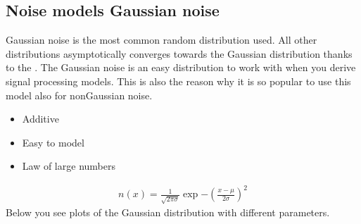 \documentclass[letterpaper,10pt,english]{sphinxmanual}
\begin{document}
\noindent{}


\subsection{Noise models \sphinxhyphen{} Gaussian noise}
\label{\detokenize{02-ImageEnhancement:noise-models-gaussian-noise}}
\sphinxAtStartPar
Gaussian noise is the most common random distribution used. All other distributions asymptotically converges towards the Gaussian distribution thanks to the . The Gaussian noise is an easy distribution to work with when you derive signal processing models. This is also the reason why it is so popular to use this model also for non\sphinxhyphen{}Gaussian noise.
\begin{itemize}
\item {} 
\sphinxAtStartPar
Additive

\item {} 
\sphinxAtStartPar
Easy to model

\item {} 
\sphinxAtStartPar
Law of large numbers

\end{itemize}

\sphinxAtStartPar
{}
\begin{equation*}
\begin{split}n(x)=\frac{1}{\sqrt{2\pi\sigma}}\exp{-\left(\frac{x-\mu}{2\sigma}\right)^2}\end{split}
\end{equation*}
\sphinxAtStartPar
Below you see plots of the Gaussian distribution with different parameters.
\end{document}
